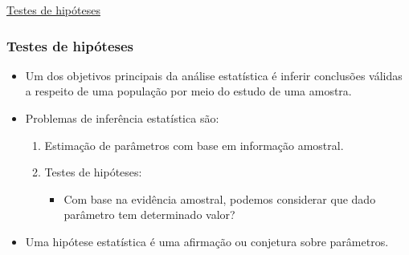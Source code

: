 \documentclass[10pt,
  aspectratio=169,
  serif,
  mathserif,
  professionalfont,
  compress,
  handout,
  ]{beamer}\usepackage[]{graphicx}\usepackage[]{color}
\begin{document}

\begin{frame}[c, allowframebreaks]

\begin{center}

  {\normalsize \href{https://lineu96.github.io/st/}{Testes de hipóteses}}
  
\end{center}

\end{frame}


\begin{frame}
  \frametitle{Testes de hipóteses}
  \begin{itemize}
    \itemsep 2ex
  
  \item Um dos objetivos principais da análise estatística é inferir conclusões válidas a respeito de uma população por meio do estudo de uma amostra. 
  
  \item Problemas de inferência estatística são:
    \begin{enumerate}
      
      \item Estimação de parâmetros com base em informação amostral.
      
      \item Testes de hipóteses:
        \begin{itemize}
          \item Com base na evidência amostral, podemos considerar que dado parâmetro tem determinado valor?
        \end{itemize}
    
    \end{enumerate}

  
  \item Uma hipótese estatística é uma afirmação ou conjetura sobre parâmetros.
  
  \end{itemize}
  
\end{frame}

\end{document}
